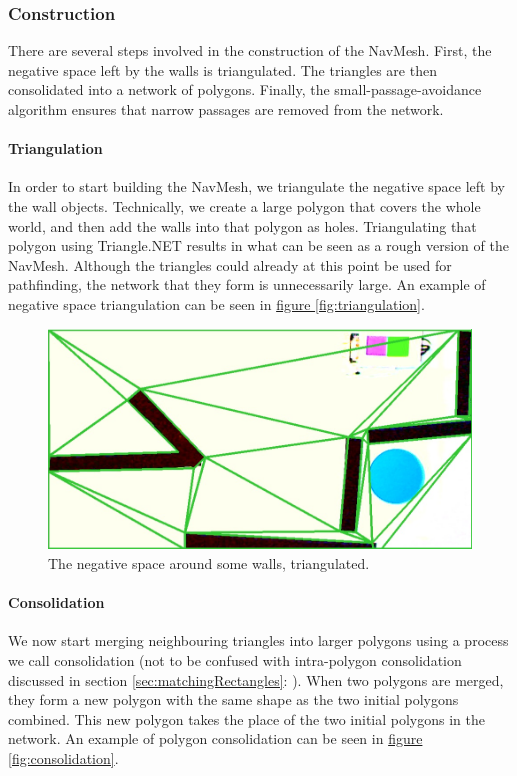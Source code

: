 \documentclass[10pt,twocolumn]{scrartcl}
\newcommand{\fref}[1]{\hyperref[#1]{figure \vref{#1}}}
\newcommand{\sref}[1]{section \vref{#1}: \nameref{#1}}
\begin{document}
\subsubsection{Construction}
There are several steps involved in the construction of the NavMesh. First, the negative space left by the walls is triangulated. The triangles are then consolidated into a network of polygons. Finally, the small-passage-avoidance algorithm ensures that narrow passages are removed from the network.

\paragraph{Triangulation}
In order to start building the NavMesh, we triangulate the negative space left by the wall objects. Technically, we create a large polygon that covers the whole world, and then add the walls into that polygon as holes. Triangulating that polygon using Triangle.NET results in what can be seen as a rough version of the NavMesh. Although the triangles could already at this point be used for pathfinding, the network that they form is unnecessarily large. An example of negative space triangulation can be seen in \fref{fig:triangulation}.

\begin{figure}
	\centering
	\includegraphics[width=\columnwidth]{pictures/triangulation.png}
	\caption{The negative space around some walls, triangulated.}
	\label{fig:triangulation}
\end{figure}

\paragraph{Consolidation}
We now start merging neighbouring triangles into larger polygons using a process we call consolidation (not to be confused with intra-polygon consolidation discussed in \sref{sec:matchingRectangles}). When two polygons are merged, they form a new polygon with the same shape as the two initial polygons combined. This new polygon takes the place of the two initial polygons in the network. An example of polygon consolidation can be seen in \fref{fig:consolidation}.
\end{document}

